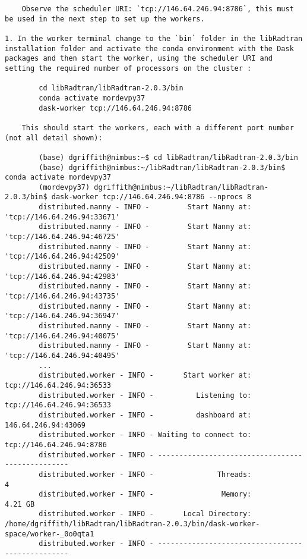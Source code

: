\begin{lstlisting}
    Observe the scheduler URI: `tcp://146.64.246.94:8786`, this must be used in the next step to set up the workers.
    
1. In the worker terminal change to the `bin` folder in the libRadtran installation folder and activate the conda environment with the Dask packages and then start the worker, using the scheduler URI and setting the required number of processors on the cluster :

        cd libRadtran/libRadtran-2.0.3/bin    
        conda activate mordevpy37    
        dask-worker tcp://146.64.246.94:8786    
        
    This should start the workers, each with a different port number (not all detail shown):
    
        (base) dgriffith@nimbus:~$ cd libRadtran/libRadtran-2.0.3/bin
        (base) dgriffith@nimbus:~/libRadtran/libRadtran-2.0.3/bin$ conda activate mordevpy37
        (mordevpy37) dgriffith@nimbus:~/libRadtran/libRadtran-2.0.3/bin$ dask-worker tcp://146.64.246.94:8786 --nprocs 8
        distributed.nanny - INFO -         Start Nanny at: 'tcp://146.64.246.94:33671'
        distributed.nanny - INFO -         Start Nanny at: 'tcp://146.64.246.94:46725'
        distributed.nanny - INFO -         Start Nanny at: 'tcp://146.64.246.94:42509'
        distributed.nanny - INFO -         Start Nanny at: 'tcp://146.64.246.94:42983'
        distributed.nanny - INFO -         Start Nanny at: 'tcp://146.64.246.94:43735'
        distributed.nanny - INFO -         Start Nanny at: 'tcp://146.64.246.94:36947'
        distributed.nanny - INFO -         Start Nanny at: 'tcp://146.64.246.94:40075'
        distributed.nanny - INFO -         Start Nanny at: 'tcp://146.64.246.94:40495'
        ...
        distributed.worker - INFO -       Start worker at:  tcp://146.64.246.94:36533
        distributed.worker - INFO -          Listening to:  tcp://146.64.246.94:36533
        distributed.worker - INFO -          dashboard at:        146.64.246.94:43069
        distributed.worker - INFO - Waiting to connect to:   tcp://146.64.246.94:8786
        distributed.worker - INFO - -------------------------------------------------
        distributed.worker - INFO -               Threads:                          4
        distributed.worker - INFO -                Memory:                    4.21 GB
        distributed.worker - INFO -       Local Directory: /home/dgriffith/libRadtran/libRadtran-2.0.3/bin/dask-worker-space/worker-_0o0qta1
        distributed.worker - INFO - -------------------------------------------------

\end{lstlisting}
